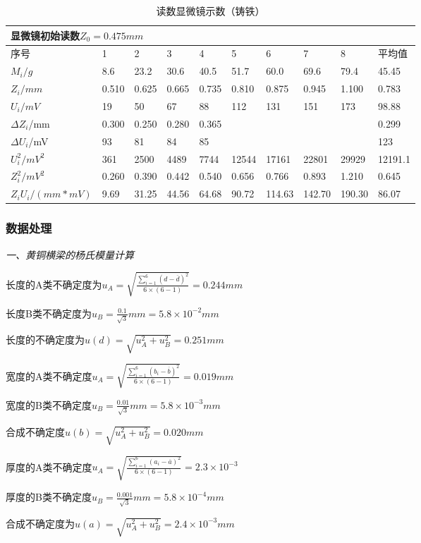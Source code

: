 \documentclass[UTF-8,twoside,cs4size]{ctexart}
\begin{document}
\begin{table}[!h]
    \centering
    \caption{读数显微镜示数（铸铁）}
    \begin{tabular}{|l|l|l|l|l|l|l|l|l|l|}
        \multicolumn{10}{l}{显微镜初始读数$Z_0=0.475mm$} \\ \hline
        序号 & 1 & 2 & 3 & 4 & 5 & 6 & 7 & 8 & 平均值 \\ \hline
        $M_i/g$ & 8.6 & 23.2 & 30.6 & 40.5 & 51.7 & 60.0 & 69.6 & 79.4 & 45.45 \\ \hline
        $Z_i/mm$ & 0.510 & 0.625 & 0.665 & 0.735 & 0.810 & 0.875 & 0.945 & 1.100 & 0.783 \\ \hline
        $U_i/mV$ & 19 & 50 & 67 & 88 & 112 & 131 & 151 & 173 &  98.88\\ \hline
        $\Delta Z_i$/mm & 0.300 & 0.250 & 0.280 & 0.365 & \multicolumn{4}{c|}{} &0.299 \\ \cline{1-5}\cline{10-10}
        $\Delta U_i$/mV & 93 & 81 & 84 & 85 &\multicolumn{4}{c|}{} & 123 \\ \hline
        $U_i^2/mV^2$ & 361 & 2500 & 4489 & 7744 & 12544 & 17161 & 22801 & 29929 & 12191.1 \\ \hline
        $Z_i^2/mV^2$ & 0.260 & 0.390 & 0.442 & 0.540 & 0.656 & 0.766 & 0.893 & 1.210 & 0.645 \\ \hline
        $Z_iU_i/(mm*mV)$ & 9.69 & 31.25 & 44.56 & 64.68 & 90.72 & 114.63 & 142.70 & 190.30 & 86.07 \\ \hline
    \end{tabular}
\end{table}
\newpage
\subsubsection{数据处理}
\textit{一、黄铜横梁的杨氏模量计算}

长度的A类不确定度为${u_A} = \sqrt {\frac{{\sum\limits_{i = 1}^6 {{{\left( {d - \overline d } \right)}^2}} }}{{6 \times \left( {6 - 1} \right)}}}  = 0.244mm$\par
长度B类不确定度为$ {u_B} = \frac{{0.1}}{{\sqrt 3 }}mm=5.8 \times {10^{ - 2}}mm$ \par
长度的不确定度为$u\left( d \right) = \sqrt {u_A^2 + u_B^2}  = 0.251mm$\par
宽度的A类不确定度${u_A} = \sqrt {\frac{{\sum\limits_{i = 1}^6 {{{\left( {{b_i} - \overline b } \right)}^2}} }}{{6 \times \left( {6 - 1} \right)}}}  = 0.019mm$\par
宽度的B类不确定度${u_B} = \frac{{0.01}}{{\sqrt 3 }}mm = 5.8 \times {10^{ - 3}}mm$\par
合成不确定度$u\left( b \right) = \sqrt {u_A^2 + u_B^2}  = 0.020mm$\par
厚度的A类不确定度${u_A} = \sqrt {\frac{{\sum\limits_{i = 1}^6 {{{\left( {{a_i} - \overline a } \right)}^2}} }}{{6 \times \left( {6 - 1} \right)}}}  = 2.3 \times {10^{ - 3}}$\par
厚度的B类不确定度${u_B} = \frac{{0.001}}{{\sqrt 3 }}mm = 5.8 \times {10^{ - 4}}mm$\par
合成不确定度为$u\left( a \right) = \sqrt {u_A^2 + u_B^2}  = 2.4 \times {10^{ - 3}}mm$
\end{document}
